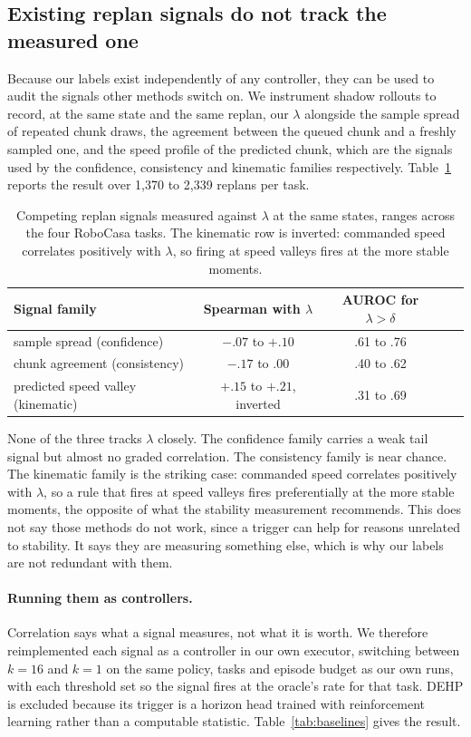 \subsection{Existing replan signals do not track the measured one}
\label{sec:proxies}

Because our labels exist independently of any controller, they can be used to
audit the signals other methods switch on. We instrument shadow rollouts to
record, at the same state and the same replan, our $\lambda$ alongside the
sample spread of repeated chunk draws, the agreement between the queued chunk
and a freshly sampled one, and the speed profile of the predicted chunk, which
are the signals used by the confidence, consistency and kinematic families
respectively. Table~\ref{tab:proxies} reports the result over 1{,}370 to
2{,}339 replans per task.

\begin{table}[t]
\centering
\small
\begin{tabular}{lcccc}
\toprule
Signal family & Spearman with $\lambda$ & AUROC for $\lambda > \delta$ \\
\midrule
sample spread (confidence) & $-.07$ to $+.10$ & .61 to .76 \\
chunk agreement (consistency) & $-.17$ to $.00$ & .40 to .62 \\
predicted speed valley (kinematic) & $+.15$ to $+.21$, inverted & .31 to .69 \\
\bottomrule
\end{tabular}
\caption{Competing replan signals measured against $\lambda$ at the same
states, ranges across the four RoboCasa tasks. The kinematic row is inverted:
commanded speed correlates positively with $\lambda$, so firing at speed
valleys fires at the more stable moments.}
\label{tab:proxies}
\end{table}

None of the three tracks $\lambda$ closely. The confidence family carries a
weak tail signal but almost no graded correlation. The consistency family is
near chance. The kinematic family is the striking case: commanded speed
correlates positively with $\lambda$, so a rule that fires at speed valleys
fires preferentially at the more stable moments, the opposite of what the
stability measurement recommends. This does not say those methods do not work,
since a trigger can help for reasons unrelated to stability. It says they are
measuring something else, which is why our labels are not redundant with them.

\paragraph{Running them as controllers.}
Correlation says what a signal measures, not what it is worth. We therefore
reimplemented each signal as a controller in our own executor, switching
between $k{=}16$ and $k{=}1$ on the same policy, tasks and episode budget as
our own runs, with each threshold set so the signal fires at the oracle's rate
for that task. DEHP is excluded because its trigger is a horizon head trained
with reinforcement learning rather than a computable statistic.
Table~\ref{tab:baselines} gives the result.

